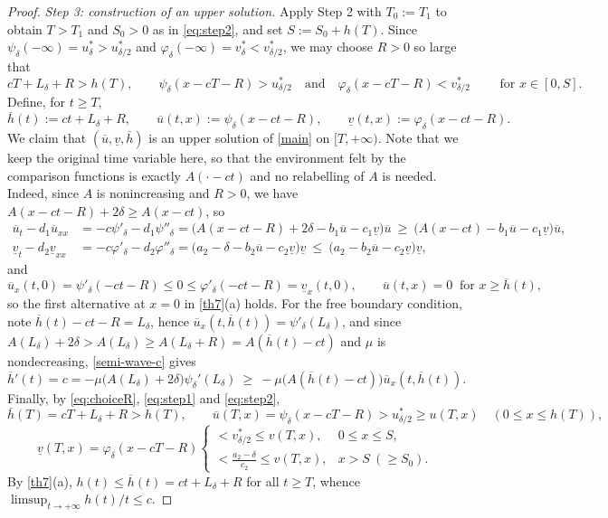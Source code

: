 \documentclass[reqno]{amsart}
\theoremstyle{plain}
\theoremstyle{definition}
\theoremstyle{remark}
\begin{document}
\begin{proof}
	\textit{Step 3: construction of an upper solution.} Apply Step 2 with
	$T_0:=T_1$ to obtain $T>T_1$ and $S_0>0$ as in \eqref{eq:step2}, and set
	$S:=S_0+h(T)$. Since $\psi_\delta(-\infty)=u^*_\delta>u^*_{\delta/2}$ and
	$\varphi_\delta(-\infty)=v^*_\delta<v^*_{\delta/2}$, we may choose $R>0$ so
	large that
	\begin{equation}\label{eq:choiceR}
		cT+L_\delta+R>h(T),
		\qquad
		\psi_{\delta}(x -cT-R) > u^*_{\delta/2}
		\quad\text{and}\quad
		\varphi_{\delta}(x -cT- R) < v^*_{\delta/2}
		\qquad\text{ for } x\in[0,S].
	\end{equation}
	Define, for $t\ge T$,
	\[
	\overline{h}(t) := c t + L_\delta + R,\qquad
	\overline{u}(t,x) := \psi_{\delta}(x-ct -R),\qquad
	\underline{v}(t,x) := \varphi_{\delta}(x-ct-R).
	\]
	We claim that $(\overline u,\underline v,\overline h)$ is an upper solution of
	\eqref{main} on $[T,+\infty)$. Note that we keep the original time variable
	here, so that the environment felt by the comparison functions is exactly
	$A(\cdot-ct)$ and no relabelling of $A$ is needed. Indeed, since $A$ is nonincreasing and
	$R>0$, we have $A(x-ct-R)+2\delta\ge A(x-ct)$, so
	\begin{align*}
		\overline{u}_t - d_1 \overline{u}_{xx}
		&= -c\psi'_\delta-d_1\psi''_\delta
		= \big(A(x - c t - R) + 2\delta - b_1 \overline u - c_1 \underline v\big) \overline u
		\ \ge\ \big(A(x - ct) - b_1 \overline{u} - c_1 \underline{v}\big) \overline{u},\\
		\underline{v}_t - d_2 \underline{v}_{xx}
		&= -c\varphi'_\delta-d_2\varphi''_\delta
		= \big(a_2 - \delta - b_2\overline u - c_2\underline v\big) \underline v
		\ \le\ \big(a_2 - b_2\overline{u} - c_2\underline{v}\big)\underline{v},
	\end{align*}
	and
	\[
	\overline{u}_x(t, 0)=\psi'_\delta(-ct-R) \le 0 \le \varphi'_\delta(-ct-R)=\underline{v}_x(t, 0),
	\qquad
	\overline{u}(t, x) = 0 \ \text{ for } x\ge \overline{h}(t) ,
	\]
	so the first alternative at $x=0$ in \cref{th7}(a) holds. For the free boundary
	condition, note $\overline h(t)-ct-R=L_\delta$, hence
	$\overline u_x(t,\overline h(t))=\psi'_\delta(L_\delta)$, and since
	$A(L_\delta)+2\delta> A(L_\delta)\ge A(L_\delta+R)=A(\overline h(t)-ct)$ and
	$\mu$ is nondecreasing, \eqref{semi-wave-c} gives
	\[
	\overline{h}'(t) = c = -\mu\big(A(L_\delta)+2 \delta\big) \psi_{\delta}'(L_\delta)
	\ \ge\ -\mu\big(A(\overline h(t)-ct)\big) \overline u_x(t,\overline h(t)) .
	\]
	Finally, by \eqref{eq:choiceR}, \eqref{eq:step1} and \eqref{eq:step2},
	\[
	\overline h(T)=cT+L_\delta+R>h(T),\qquad
	\overline{u}(T, x) = \psi_\delta(x-cT-R)>u^*_{\delta/2}\ge u(T,x)\quad (0\le x\le h(T)),
	\]
	\[
	\underline{v}(T, x) = \varphi_\delta(x-cT-R)
	\begin{cases}
		<v^*_{\delta/2}\le v(T,x), & 0\le x\le S,\\[2pt]
		<\frac{a_2-\delta}{c_2}\le v(T,x), & x> S\ (\ge S_0).
	\end{cases}
	\]
	By \cref{th7}(a), $h(t)\le\overline{h}(t)=ct+L_\delta+R$ for all $t\ge T$,
	whence $\limsup_{t\to+\infty}h(t)/t\le c$.
\end{proof}
\end{document}
